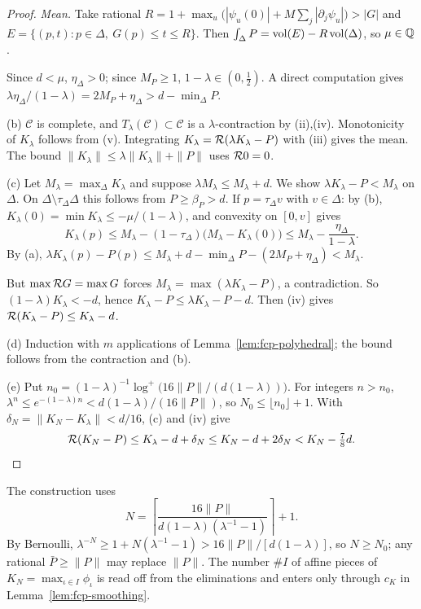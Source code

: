 \begin{proof}
\emph{Mean.} Take rational $R=1+\max_u\bigl(|\psi_u(0)|+M\sum_j|\partial_j\psi_u|\bigr)>|G|$ and $E=\{(p,t):p\in\Delta,\ G(p)\le t\le R\}$. Then $\int_\Delta P=\operatorname{vol}(E)-R\operatorname{vol}(\Delta)$, so $\mu\in\mathbb{Q}$.

Since $d<\mu$, $\eta_\Delta>0$; since $M_P\ge1$, $1-\lambda\in(0,\tfrac12)$. A direct computation gives $\lambda\eta_\Delta/(1-\lambda)=2M_P+\eta_\Delta>d-\min_\Delta P$.

(b) $\mathcal C$ is complete, and $T_\lambda(\mathcal C)\subset\mathcal C$ is a $\lambda$-contraction by (ii),(iv). Monotonicity of $K_\lambda$ follows from (v). Integrating $K_\lambda=\mathcal{R}(\lambda K_\lambda-P)$ with (iii) gives the mean. The bound $\|K_\lambda\|\le\lambda\|K_\lambda\|+\|P\|$ uses $\mathcal{R}0=0$.

(c) Let $M_\lambda=\max_\Delta K_\lambda$ and suppose $\lambda M_\lambda\le M_\lambda+d$. We show $\lambda K_\lambda-P<M_\lambda$ on $\Delta$. On $\Delta\setminus\tau_\Delta\Delta$ this follows from $P\ge\beta_P>d$. If $p=\tau_\Delta v$ with $v\in\Delta$: by (b), $K_\lambda(0)=\min K_\lambda\le-\mu/(1-\lambda)$, and convexity on $[0,v]$ gives
\[
 K_\lambda(p)\le M_\lambda-(1-\tau_\Delta)\bigl(M_\lambda-K_\lambda(0)\bigr)\le M_\lambda-\frac{\eta_\Delta}{1-\lambda}.
\]
By (a), $\lambda K_\lambda(p)-P(p)\le M_\lambda+d-\min_\Delta P-(2M_P+\eta_\Delta)<M_\lambda$.

But $\max\mathcal{R} G=\max G$ forces $M_\lambda=\max(\lambda K_\lambda-P)$, a contradiction. So $(1-\lambda)K_\lambda<-d$, hence $K_\lambda-P\le\lambda K_\lambda-P-d$. Then (iv) gives $\mathcal{R}(K_\lambda-P)\le K_\lambda-d$.

(d) Induction with $m$ applications of Lemma~\ref{lem:fcp-polyhedral}; the bound follows from the contraction and (b).

(e) Put $n_0=(1-\lambda)^{-1}\log^+\bigl(16\|P\|/(d(1-\lambda))\bigr)$. For integers $n>n_0$, $\lambda^n\le e^{-(1-\lambda)n}<d(1-\lambda)/(16\|P\|)$, so $N_0\le\lfloor n_0\rfloor+1$. With $\delta_N=\|K_N-K_\lambda\|<d/16$, (c) and (iv) give
\[
 \mathcal{R}(K_N-P)\le K_\lambda-d+\delta_N\le K_N-d+2\delta_N<K_N-\tfrac78d .\qedhere
\]
\end{proof}

The construction uses
\[
 N=\left\lceil\frac{16\|P\|}{d(1-\lambda)(\lambda^{-1}-1)}\right\rceil+1.
\]
By Bernoulli, $\lambda^{-N}\ge1+N(\lambda^{-1}-1)>16\|P\|/[d(1-\lambda)]$, so $N\ge N_0$; any rational $\bar P\ge\|P\|$ may replace $\|P\|$. The number $\#I$ of affine pieces of $K_N=\max_{\iota\in I}\phi_\iota$ is read off from the eliminations and enters only through $c_K$ in Lemma~\ref{lem:fcp-smoothing}.

